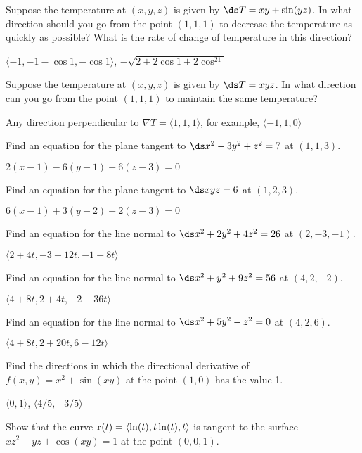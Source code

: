 \begin{exercises}
\exercise Suppose the temperature at $(x,y,z)$ is given by 
$\ds T=xy+\sin(yz)$. In what direction should you go from the point 
$(1,1,1)$ to decrease the temperature as quickly as possible? What is
the rate of change of temperature in this direction?
\begin{answer} $\langle -1,-1-\cos1,-\cos1\rangle$, $-\sqrt{2+2\cos1+2\cos^21}$
\end{answer}

\exercise Suppose the temperature at $(x,y,z)$ is given by 
$\ds T=xyz$. In what direction can you go from the point 
$(1,1,1)$ to maintain the same temperature?
\begin{answer} Any direction perpendicular to $\nabla T=\langle
1,1,1\rangle$,
for example, $\langle -1,1,0\rangle$
\end{answer}

\exercise Find an equation for the plane tangent to 
$\ds x^2-3y^2+z^2=7$ at $(1,1,3)$.
\begin{answer} $2(x-1)-6(y-1)+6(z-3)=0$
\end{answer}

\exercise Find an equation for the plane tangent to 
$\ds xyz=6$ at $(1,2,3)$.
\begin{answer} $6(x-1)+3(y-2)+2(z-3)=0$
\end{answer}

\exercise Find an equation for the line normal to 
$\ds x^2+2y^2+4z^2=26 $ at $(2,-3,-1)$.
\begin{answer} $\langle 2+4t,-3-12t,-1-8t\rangle$
\end{answer}

\exercise Find an equation for the line normal to 
$\ds x^2+y^2+9z^2=56$ at $(4,2,-2)$.
\begin{answer} $\langle 4+8t,2+4t,-2-36t\rangle$
\end{answer}

\exercise Find an equation for the line normal to 
$\ds x^2+5y^2-z^2=0$ at $(4,2,6)$.
\begin{answer} $\langle 4+8t,2+20t,6-12t\rangle$
\end{answer}

\exercise Find the directions in which the directional derivative of
$f(x,y)=x^2+\sin(xy)$ at the point $(1,0)$ has the value 1.
\begin{answer} $\langle 0,1\rangle$, $\langle 4/5,-3/5\rangle$
\end{answer}

\exercise Show that the curve 
${\bf r}(t) = \langle\ln(t),t\ln(t),t\rangle$
is tangent to the surface $xz^2-yz+\cos(xy) = 1$ at the point
$(0,0,1)$.


\end{exercises}

